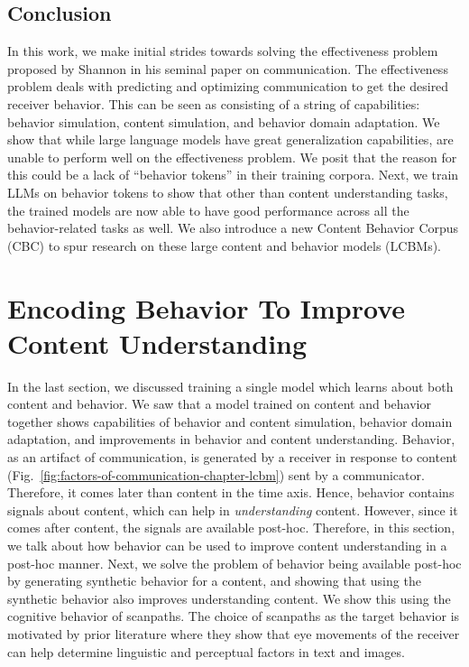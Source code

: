 \subsection{Conclusion}
In this work, we make initial strides towards solving the effectiveness problem proposed by Shannon in his seminal paper on communication. The effectiveness problem deals with predicting and optimizing communication to get the desired receiver behavior. This can be seen as consisting of a string of capabilities: behavior simulation, content simulation, and behavior domain adaptation. We show that while large language models have great generalization capabilities, are unable to perform well on the effectiveness problem. We posit that the reason for this could be a lack of ``behavior tokens'' in their training corpora. Next, we train LLMs on behavior tokens to show that other than content understanding tasks, the trained models are now able to have good performance across all the behavior-related tasks as well. We also introduce a new Content Behavior Corpus (CBC) to spur research on these large content and behavior models (LCBMs).






\section{Encoding Behavior To Improve Content Understanding}
\label{sec:Encoding Behavior To Improve Content Understanding}

In the last section, we discussed training a single model which learns about both content and behavior. We saw that a model trained on content and behavior together shows capabilities of behavior and content simulation, behavior domain adaptation, and improvements in behavior and content understanding. Behavior, as an artifact of communication, is generated by a receiver in response to content (Fig.~\ref{fig:factors-of-communication-chapter-lcbm}) sent by a communicator. Therefore, it comes later than content in the time axis. Hence, behavior contains signals about content, which can help in \textit{understanding} content. However, since it comes after content, the signals are available post-hoc. Therefore, in this section, we talk about how behavior can be used to improve content understanding in a post-hoc manner. Next, we solve the problem of behavior being available post-hoc by generating synthetic behavior for a content, and showing that using the synthetic behavior also improves understanding content. We show this using the cognitive behavior of scanpaths. The choice of scanpaths as the target behavior is motivated by prior literature \cite{clifton2007eye,demberg2008data,karessli2017gaze,yu2017supervising,he2019human,boyd2022human,mishra-etal-2016-harnessing,long-etal-2017-cognition} where they show that eye movements of the receiver can help determine linguistic and perceptual factors in text and images.

